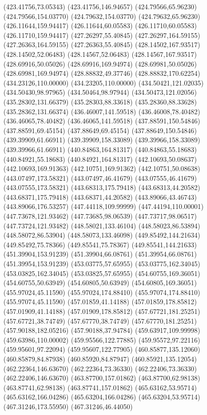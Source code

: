 {(423.41756,73.05343) (423.41756,146.94657) (424.79566,65.96230) (424.79566,154.03770) (424.79632,154.03770) (424.79632,65.96230) (426.11644,159.94417) (426.11644,60.05583)
(426.11710,60.05583) (426.11710,159.94417) (427.26297,55.40845) (427.26297,164.59155) (427.26363,164.59155) (427.26363,55.40845) (428.14502,167.93517) (428.14502,52.06483)
(428.14567,52.06483) (428.14567,167.93517) (428.69916,50.05026) (428.69916,169.94974) (428.69981,50.05026) (428.69981,169.94974) (428.88832,49.37746) (428.88832,170.62254)
(434.23126,110.00000) (434.23205,110.00000) (434.50421,121.02035) (434.50430,98.97965) (434.50464,98.97944) (434.50473,121.02056) (435.28302,131.66379) (435.28303,88.33618)
(435.28360,88.33628) (435.28362,131.66374) (436.46007,141.59518) (436.46008,78.40482) (436.46065,78.40482) (436.46065,141.59518) (437.88591,150.54846) (437.88591,69.45154)
(437.88649,69.45154) (437.88649,150.54846) (439.39909,61.66911) (439.39909,158.33089) (439.39966,158.33089) (439.39966,61.66911) (440.84863,164.81317) (440.84863,55.18683)
(440.84921,55.18683) (440.84921,164.81317) (442.10693,50.08637) (442.10693,169.91363) (442.10751,169.91362) (442.10751,50.08638) (443.07497,173.58321) (443.07497,46.41679)
(443.07555,46.41679) (443.07555,173.58321) (443.68313,175.79418) (443.68313,44.20582) (443.68371,175.79418) (443.68371,44.20582) (443.89066,43.46743) (443.89066,176.53257)
(447.44118,109.99999) (447.44194,110.00001) (447.73678,121.93462) (447.73685,98.06539) (447.73717,98.06517) (447.73724,121.93482) (448.58021,133.46104) (448.58023,86.53894)
(448.58072,86.53904) (448.58073,133.46098) (449.85492,144.21634) (449.85492,75.78366) (449.85541,75.78367) (449.85541,144.21633) (451.39904,153.91239) (451.39904,66.08761)
(451.39954,66.08761) (451.39954,153.91239) (453.03775,57.65955) (453.03775,162.34045) (453.03825,162.34045) (453.03825,57.65955) (454.60755,169.36051) (454.60755,50.63949)
(454.60805,50.63949) (454.60805,169.36051) (455.97024,45.11590) (455.97024,174.88410) (455.97074,174.88410) (455.97074,45.11590) (457.01859,41.14188) (457.01859,178.85812)
(457.01909,41.14188) (457.01909,178.85812) (457.67721,181.25251) (457.67721,38.74749) (457.67770,38.74749) (457.67770,181.25251) (457.90188,182.05216) (457.90188,37.94784)
(459.63917,109.99998) (459.63986,110.00002) (459.95566,122.77885) (459.95572,97.22116) (459.95601,97.22094) (459.95607,122.77905) (460.85877,135.12060) (460.85879,84.87938)
(460.85920,84.87947) (460.85921,135.12054) (462.22364,146.63670) (462.22364,73.36330) (462.22406,73.36330) (462.22406,146.63670) (463.87700,157.01862) (463.87700,62.98138)
(463.87741,62.98138) (463.87741,157.01862) (465.63162,53.95714) (465.63162,166.04286) (465.63204,166.04286) (465.63204,53.95714) (467.31246,173.55950) (467.31246,46.44050)
}
